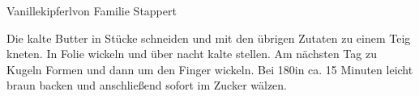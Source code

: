 \begin{recipe}{Vanillekipferl}{von Familie Stappert}


  \steps

  Die kalte Butter in Stücke schneiden und mit den übrigen Zutaten zu einem
  Teig kneten. In Folie wickeln und über nacht kalte stellen. Am nächsten Tag
  zu Kugeln Formen und dann um den Finger wickeln. Bei 180\celsius in ca. 15
  Minuten leicht braun backen und anschließend sofort im Zucker wälzen.

\end{recipe}
